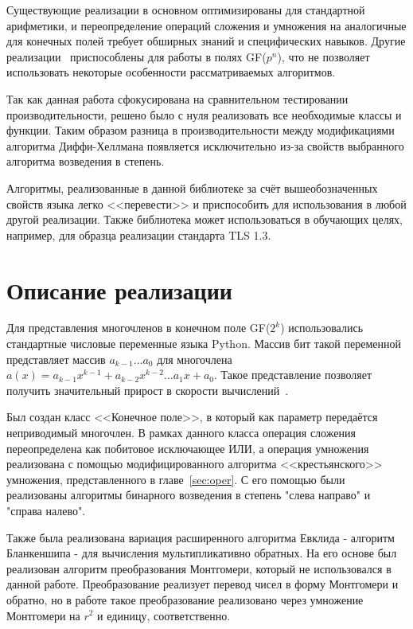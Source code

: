 \documentclass[times,specification,annotation]{itmo-student-thesis}
\begin{document}
Существующие реализации  в основном оптимизированы для стандартной арифметики, и переопределение операций
сложения и умножения на аналогичные для конечных полей требует обширных знаний и специфических навыков.
Другие реализации~\cite{pri16} приспособлены для работы в полях GF($p^n$), что не позволяет использовать
некоторые особенности рассматриваемых алгоритмов.

Так как данная работа сфокусирована на сравнительном тестировании производительности, решено было с нуля
реализовать все необходимые классы и функции.
Таким образом разница в производительности между модификациями алгоритма Диффи-Хеллмана появляется исключительно
из-за свойств выбранного алгоритма возведения в степень.

Алгоритмы, реализованные в данной библиотеке за счёт вышеобозначенных свойств языка легко <<перевести>> и приспособить для
использования в любой другой реализации.
Также библиотека может использоваться в обучающих целях, например, для образца реализации стандарта TLS 1.3.

\section{Описание реализации}\label{sec:impl}

Для представления многочленов в конечном поле GF($2^k$) использовались стандартные числовые переменные языка Python.
Массив бит такой переменной представляет массив $a_{k-1} \dots a_0$ для многочлена
$a(x) = a_{k-1} x^{k-1} + a_{k-2} x^{k-2} \dots a_1 x + a_0$.
Такое представление позволяет получить значительный прирост в скорости вычислений~\cite{mau15}.

Был создан класс <<Конечное поле>>, в который как параметр передаётся неприводимый многочлен.
В рамках данного класса операция сложения переопределена как побитовое исключающее ИЛИ, а операция умножения
реализована с помощью модифицированного алгоритма <<крестьянского>> умножения, представленного в главе~\ref{sec:oper}.
С его помощью были реализованы алгоритмы бинарного возведения в степень "слева направо" и "справа налево".

Также была реализована вариация расширенного алгоритма Евклида - алгоритм Бланкеншипа - для вычисления мультипликативно обратных.
На его основе был реализован алгоритм преобразования Монтгомери, который не использовался в данной работе.
Преобразование реализует перевод чисел в форму Монтгомери и обратно, но в работе такое преобразование реализовано через
умножение Монтгомери на $r^2$ и единицу, соответственно.
\end{document}
